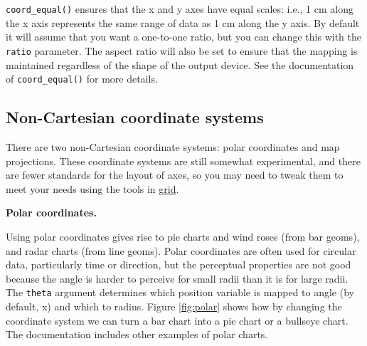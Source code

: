 \texttt{coord\_equal()} ensures that the x and y axes have equal scales:
i.e., 1 cm along the x axis represents the same range of data as 1 cm
along the y axis. By default it will assume that you want a one-to-one
ratio, but you can change this with the \texttt{ratio} parameter. The
aspect ratio will also be set to ensure that the mapping is maintained
regardless of the shape of the output device. See the documentation of
\texttt{coord\_equal()} for more details. 
 

\subsection{Non-Cartesian coordinate systems}

There are two non-Cartesian coordinate systems: polar coordinates and
map projections. These coordinate systems are still somewhat
experimental, and there are fewer standards for the layout of axes, so
you may need to tweak them to meet your needs using the tools in
\hyperref[cha:grid]{grid}. 

\textbf{Polar coordinates.}

Using polar coordinates gives rise to pie charts and wind roses (from
bar geoms), and radar charts (from line geoms). Polar coordinates are
often used for circular data, particularly time or direction, but the
perceptual properties are not good because the angle is harder to
perceive for small radii than it is for large radii. The \texttt{theta}
argument determines which position variable is mapped to angle (by
default, x) and which to radius. Figure \ref{fig:polar} shows how by
changing the coordinate system we can turn a bar chart into a pie chart
or a bullseye chart. The documentation includes other examples of polar
charts.  

\begin{Shaded}
\begin{Highlighting}[]
\StringTok{ }\NormalTok{(} \NormalTok{(}\NormalTok{), } 
\StringTok{  }\NormalTok{(} \NormalTok{))}
\StringTok{ }\NormalTok{(} \NormalTok{)}

\StringTok{ }\NormalTok{()}
\end{Highlighting}
\end{Shaded}

